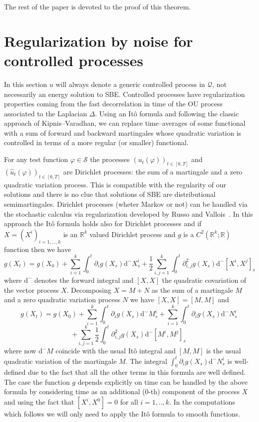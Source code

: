 \documentclass[a4paper,11pt]{article}
\newcommand{\mathd}{\mathrm{d}}
\newcommand{\cS}{\mathscr{S}}
\begin{document}
The rest of the paper is devoted to the proof of this theorem.

\section{Regularization by noise for controlled processes}

In this section $u$ will always denote a generic controlled process in
$\mathcal{Q}$, not necessarily an energy solution to SBE. Controlled processes
have regularization properties coming from the fast decorrelation in time of
the OU process associated to the Laplacian $\Delta$. Using an It{\^o} formula
and following the classic approach of Kipnis--Varadhan, we can replace
time--averages of some functional with a sum of forward and backward
martingales whose quadratic variation is controlled in terms of a more regular
(or smaller) functional.

For any test function $\varphi \in \cS$ the processes $(u_t (\varphi))_{t \in
[0, T]}$ and $(\hat{u}_t (\varphi))_{t \in [0, T]}$ are Dirichlet processes:
the sum of a martingale and a zero quadratic variation process. This is
compatible with the regularity of our solutions and there is no clue that
solutions of SBE are distributional semimartingales. Dirichlet processes
(wheter Markov or not) can be handled via the stochastic calculus via
regularization developed by Russo and Vallois~{\cite{russo_elements_2007}}. In
this approach the It{\^o} formula holds also for Dirichlet processes and if $X
= (X^i)_{i = 1, \ldots, k}$ is an $\mathbb{R}^k$ valued Dirichlet process and
$g$ is a $C^2 (\mathbb{R}^k ; \mathbb{R})$ function then we have
\begin{equation}
  g (X_t) = g (X_0) + \sum_{i = 1}^k \int_0^t \partial_i g (X_s) \mathd^-
  X^i_s + \frac{1}{2}  \sum_{i, j = 1}^k \int_0^t \partial^2_{i, j} g (X_s)
  \mathd^- [X^i, X^j]_s \label{eq:ito-fv}
\end{equation}
where $\mathd^-$ denotes the forward integral and $[X, X]$ the quadratic
covariation of the vector process $X$. Decomposing $X = M + N$ as the sum of a
martingale $M$ and a zero quadratic variation process $N$ we have $[X, X] =
[M, M]$ and
\[ g (X_t) = g (X_0) + \sum_{i = 1}^k \int_0^t \partial_i g (X_s) \mathd^-
   M^i_s + \sum_{i = 1}^k \int_0^t \partial_i g (X_s) \mathd^- N^i_s \]
\[ + \sum_{i, j = 1}^k \frac{1}{2}  \int_0^t \partial^2_{i, j} g (X_s)
   \mathd^- [M^i, M^j]_s \]
where now $\mathd^- M$ coincide with the usual It{\^o} integral and $[M, M]$
is the usual quadratic variation of the martingale $M$. The integral $\int_0^t
\partial_i g (X_s) \mathd^- N^i_s$ is well-defined due to the fact that all
the other terms in this formula are well defined. The case the function $g$
depends explicitly on time can be handled by the above formula by considering
time as an additional ($0$-th) component of the process $X$ and using the fact
that $[X^i, X^0] = 0$ for all $i = 1, .., k$. In the computations which
follows we will only need to apply the It{\^o} formula to smooth functions.
\end{document}
